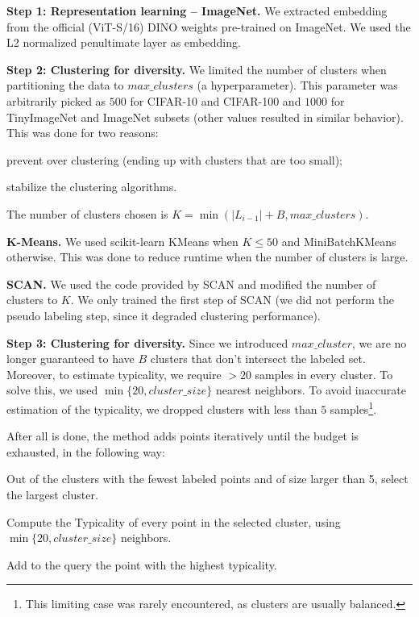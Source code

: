\documentclass{article}
\newcommand{\myparagraph}[1]{\smallskip\noindent\textbf{#1}}
\begin{document}
\myparagraph{Step 1: Representation learning -- ImageNet.}
We extracted embedding from the official (ViT-S/16) DINO weights pre-trained on ImageNet. We used the L2 normalized penultimate layer as embedding.


\myparagraph{Step 2: Clustering for diversity.}
We limited the number of clusters when partitioning the data to  $max\_clusters$ (a hyperparameter). This parameter was arbitrarily picked as $500$ for CIFAR-10 and CIFAR-100 and $1000$ for TinyImageNet and ImageNet subsets (other values resulted in similar behavior).
This was done for two reasons: \begin{inparaenum}[(a)]
    \item prevent over clustering (ending up with clusters that are too small);
    \item stabilize the clustering algorithms.
\end{inparaenum}
The number of clusters chosen is $K=\min(|L_{i-1}|+B, max\_clusters)$.

\myparagraph{K-Means.} 
We used scikit-learn KMeans when $K\le 50$ and MiniBatchKMeans otherwise. This was done to reduce runtime when the number of clusters is large.

\myparagraph{SCAN.} 
We used the code provided by SCAN and modified the number of clusters to $K$. We only trained the first step of SCAN (we did not perform the pseudo labeling step, since it degraded clustering performance).


\myparagraph{Step 3: Clustering for diversity.}
Since we introduced $max\_cluster$, we are no longer guaranteed to have $B$ clusters that don't intersect the labeled set.
Moreover, to estimate typicality, we require $>20$ samples in every cluster. To solve this, we used $\min\{20, cluster\_size\}$ nearest neighbors. To avoid inaccurate estimation of the typicality, we dropped clusters with less than $5$ samples\footnote{This limiting case was rarely encountered, as clusters are usually balanced.}.

After all is done, the method adds points iteratively until the budget is exhausted, in the following way: 
\begin{inparaenum}[(1)]
    \item Out of the clusters with the fewest labeled points and of size larger than 5, select the largest cluster.
    \item Compute the Typicality of every point in the selected cluster, using $\min\{20, cluster\_size\}$ neighbors.
    \item Add to the query the point with the highest typicality.
\end{inparaenum}
\end{document}
